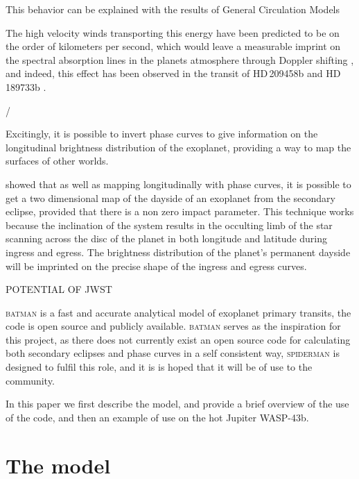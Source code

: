 \documentclass[a4paper,fleqn,usenatbib]{mnras}
\begin{document}
This behavior can be explained with the results of General Circulation Models \citep{Komacek2015,Komacek2016}

The high velocity winds transporting this energy have been predicted to be on the order of kilometers per second, which would leave a measurable imprint on the spectral absorption lines in the planets atmosphere through Doppler shifting \citep[e.g.][]{Showman2013}, and indeed, this effect has been observed in the transit of HD\,209458b \citep{Snellen2010} and HD\,189733b \citep{Louden2015}. 

/%

Excitingly, it is possible to invert phase curves to give information on the longitudinal brightness distribution of the exoplanet, providing a way to map the surfaces of other worlds. 

\cite{Majeau2012} showed that as well as mapping longitudinally with phase curves, it is possible to get a two dimensional map of the dayside of an exoplanet from the secondary eclipse, provided that there is a non zero impact parameter. This technique works because the inclination of the system results in the occulting limb of the star scanning across the disc of the planet in both longitude and latitude during ingress and egress. The brightness distribution of the planet's permanent dayside will be imprinted on the precise shape of the ingress and egress curves.

POTENTIAL OF JWST

\textsc{batman} \citep{Kreidberg2015a} is a fast and accurate analytical model of exoplanet primary transits, the code is open source and publicly available. \textsc{batman} serves as the inspiration for this project, as there does not currently exist an open source code for calculating both secondary eclipses and phase curves in a self consistent way, \textsc{spiderman} is designed to fulfil this role, and it is is hoped that it will be of use to the community.

In this paper we first describe the model, and provide a brief overview of the use of the code, and then an example of use on the hot Jupiter WASP-43b.

\section{The model}\label{sec:the model}
\end{document}

